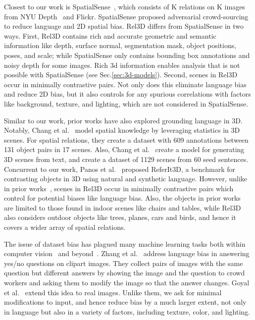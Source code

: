 \documentclass{article}
\newcommand{\smallsec}[1]{\noindent {\bf #1.}}
\newcommand\datasetname{Rel3D}
\begin{document}
Closest to our work is SpatialSense~\cite{yang2019spatialsense}, which consists of K relations on K images from NYU Depth~\cite{silberman2012indoor} and Flickr. SpatialSense proposed adversarial crowd-sourcing to reduce language and 2D spatial bias. {\datasetname } differs from SpatialSense in two ways. First, {\datasetname } contains rich and accurate geometric and semantic information like depth, surface normal, segmentation mask, object positions, poses, and scale; while SpatialSense only contains bounding box annotations and noisy depth for some images. Rich 3d information enables analysis that is not possible with SpatialSense (see Sec.\ref{sec:3d-models}). Second, scenes in {\datasetname } occur in minimally contrastive pairs. Not only does this eliminate language bias and reduce 2D bias, but it also controls for any spurious correlations with factors like background, texture, and lighting, which are not considered in SpatialSense. 

\smallsec{Language and 3D} Similar to our work, prior works have also explored grounding language in 3D. 
Notably, Chang et al.~\cite{chang2014learning} model spatial knowledge by leveraging statistics in 3D scenes. For spatial relations, they create a dataset with 609 annotations between 131 object pairs in 17 scenes. Also, Chang et al.~\cite{chang2015text} create a model for generating 3D scenes from text, and create a dataset of 1129 scenes from 60 seed sentences. Concurrent to our work, Panos et al.~\cite{achlioptas2020referit_3d} proposed ReferIt3D, a benchmark for contrasting objects in 3D using natural and synthetic language. 
However, unlike in prior works~\cite{chang2014learning, chang2015text, achlioptas2020referit_3d}, scenes in Rel3D occur in minimally contrastive pairs which control for potential biases like language bias. Also, the objects in prior works~\cite{chang2014learning, chang2015text, achlioptas2020referit_3d} are limited to those found in indoor scenes like chairs and tables, while Rel3D also considers outdoor objects like trees, planes, cars and birds, and hence it covers a wider array of spatial relations.

\smallsec{Dataset bias} The issue of dataset bias has plagued many machine learning tasks both within computer vision~\cite{zhang2016yin,goyal2017making,yang2019spatialsense} and beyond~\cite{zellers2018swag,he2019unlearn,clark2019don,le2020adversarial}. Zhang et al.~\cite{zhang2016yin} address language bias in answering yes/no questions on clipart images. They collect pairs of images with the same question but different answers by showing the image and the question to crowd workers and asking them to modify the image so that the answer changes.  Goyal et al.~\cite{goyal2017making} extend this idea to real images. Unlike them, we ask for minimal modifications to input, and hence reduce bias by a much larger extent, not only in language but also in a variety of factors, including texture, color, and lighting.  
\end{document}
